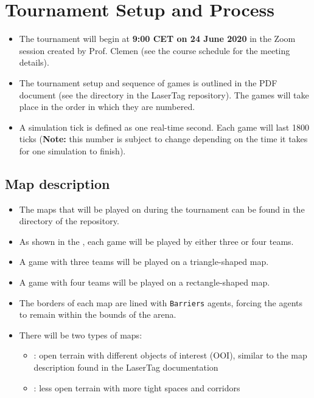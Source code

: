 \documentclass[
    a4paper,
    english,
    DIV=16,
    11pt,
    parskip=half,
]{scrartcl}
\begin{document}
\section*{Tournament Setup and Process}
\begin{itemize}
    \item The tournament will begin at \textbf{9:00 CET on 24 June 2020} in the Zoom session created by Prof. Clemen (see the course schedule for the meeting details).
    \item The tournament setup and sequence of games is outlined in the PDF document  (see the  directory in the LaserTag repository). The games will take place in the order in which they are numbered.
    \item A simulation tick is defined as one real-time second. Each game will last 1800 ticks (\textbf{Note:} this number is subject to change depending on the time it takes for one simulation to finish).
\end{itemize}

\subsection*{Map description}
\begin{itemize}
    \item The maps that will be played on during the tournament can be found in the  directory of the repository.
    \item As shown in the , each game will be played by either three or four teams.
    \item A game with three teams will be played on a triangle-shaped map.
    \item A game with four teams will be played on a rectangle-shaped map.
    \item The borders of each map are lined with \texttt{Barriers} agents, forcing the agents to remain within the bounds of the arena.
    \item There will be two types of maps:
    \begin{itemize}
        \item {}: open terrain with different objects of interest (OOI), similar to the map description found in the LaserTag documentation
        \item {}: less open terrain with more tight spaces and corridors
    \end{itemize}
\end{itemize}
\end{document}
